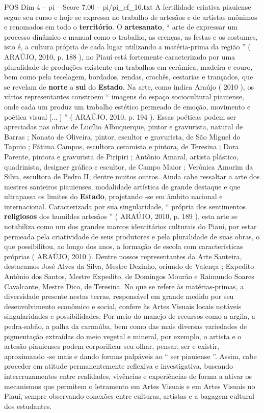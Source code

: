 \begin{textsample}{POS Dim 4 – pi – Score 7.00 – pi/pi\_ef\_16.txt}
A fertilidade criativa piauiense segue seu curso e hoje se expressa no trabalho de artesãos e de artistas anônimos e renomados em todo o \textbf{território}.
O \textbf{artesanato}, “ arte de expressar um processo dinâmico e manual como o trabalho, as crenças, as festas e os costumes, isto é, a cultura própria de cada lugar utilizando a matéria-prima da região ” ( ARAÚJO, 2010, p. 188 ), no Piauí está fortemente caracterizado por uma pluralidade de produções existente em trabalhos em cerâmica, madeira e couro, bem como pela tecelagem, bordados, rendas, crochês, cestarias e trançados, que se revelam de \textbf{norte} a \textbf{sul} do \textbf{Estado}.
Na arte, como indica Araújo ( 2010 ), os vários representantes constroem “ imagens do espaço sociocultural piauiense, onde cada um produz um trabalho estético permeado de emoção, movimento e poética visual [... ] ” ( ARAÚJO, 2010, p. 194 ).
Essas poéticas podem ser apreciadas nas obras de Lucílio Albuquerque, pintor e gravurista, natural de Barras ; Nonato de Oliveira, pintor, escultor e gravurista, de São Miguel do Tapuio ; Fátima Campos, escultora ceramista e pintora, de Teresina ; Dora Parente, pintora e gravurista de Piripiri ; Antônio Amaral, artista plástico, quadrinista, designer gráfico e escultor, de Campo Maior ; Verônica Amorim da Silva, escultora de Pedro II, dentre muitos outros.
Ainda cabe ressaltar a arte dos mestres santeiros piauienses, modalidade artística de grande destaque e que ultrapassa os limites do \textbf{Estado}, projetando -se em âmbito nacional e internacional.
Caracterizada por sua singularidade, “ própria dos sentimentos \textbf{religiosos} dos humildes artesãos ” ( ARAÚJO, 2010, p. 189 ), esta arte se notabiliza como um dos grandes marcos identitários culturais do Piauí, por estar permeada pela criatividade de seus produtores e pela pluralidade de suas obras, o que possibilitou, ao longo dos anos, a formação de escola com características próprias ( ARAÚJO, 2010 ).
Dentre nossos representantes da Arte Santeira, destacamos José Alves da Silva, Mestre Dezinho, oriundo de Valença ; Expedito Antônio dos Santos, Mestre Expedito, de Domingos Mourão e Raimundo Soares Cavalcante, Mestre Dico, de Teresina.
No que se refere às matérias-primas, a diversidade presente nestas terras, responsável em grande medida por seu desenvolvimento econômico e social, confere às Artes Visuais locais notáveis singularidades e possibilidades.
Por meio do manejo de recursos como a argila, a pedra-sabão, a palha da carnaúba, bem como das mais diversas variedades de pigmentação extraídas do meio vegetal e mineral, por exemplo, o artista e o artesão piauienses podem corporificar seu olhar, pensar, ser e existir, aproximando -se mais e dando formas palpáveis ao “ ser piauiense ”.
Assim, cabe proceder em atitude permanentemente reflexiva e investigativa, buscando intercruzamentos entre realidades, vivências e experiências de forma a ativar os mecanismos que permitem o letramento em Artes Visuais e em Artes Visuais no Piauí, sempre observando conexões entre culturas, artistas e a bagagem cultural dos estudantes.

\end{textsample}
